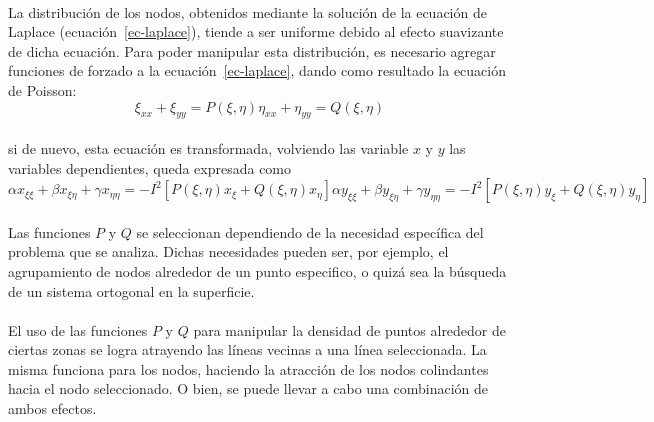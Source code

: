 \documentclass[letterpaper, openright, 12pt]{book}
\begin{document}
    \paragraph*{}
    La distribución de los nodos, obtenidos mediante la solución de la
    ecuación de Laplace (ecuación~\ref{ec-laplace}), tiende a ser uniforme
    debido al efecto suavizante de dicha ecuación. Para poder manipular esta
    distribución, es necesario agregar funciones de forzado a la
    ecuación~\ref{ec-laplace}, dando como resultado la ecuación de Poisson:
    \begin{subequations}
        \begin{equation}
            \xi_{xx} + \xi_{yy} = P(\xi, \eta)
        \end{equation}
        \begin{equation}
            \eta_{xx} + \eta_{yy} = Q(\xi, \eta)
        \end{equation}
        \label{ec-poisson}
    \end{subequations}\\
    si de nuevo, esta ecuación es transformada, volviendo las variable $x$ y
    $y$ las variables dependientes, queda expresada como
    \begin{subequations}
        \begin{equation}
            \alpha x_{\xi \xi} + \beta x_{\xi \eta}
                + \gamma x_{\eta \eta} = -I^2 [P(\xi, \eta) x_{\xi}
                + Q(\xi, \eta) x_{\eta}]
        \end{equation}
        \begin{equation}
            \alpha y_{\xi \xi} + \beta y_{\xi \eta} + \gamma y_{\eta \eta} = -I^2 [P(\xi, \eta) y_{\xi} + Q(\xi, \eta) y_{\eta}]
        \end{equation}
        \label{ec-poisson-invertida}
    \end{subequations}

    \paragraph*{}
    Las funciones $P$ y $Q$ se seleccionan dependiendo de la necesidad
    específica del problema que se analiza. Dichas necesidades pueden ser,
    por ejemplo, el agrupamiento de nodos alrededor de un punto especifico,
    o quizá sea la búsqueda de un sistema ortogonal en la superficie.

    \paragraph*{}
    El uso de las funciones $P$ y $Q$ para manipular la densidad de puntos
    alrededor de ciertas zonas se logra atrayendo las líneas vecinas a una
    línea seleccionada. La misma funciona para los nodos, haciendo la
    atracción de los nodos colindantes hacia el nodo seleccionado. O bien,
    se puede llevar a cabo una combinación de ambos efectos.
\end{document}
